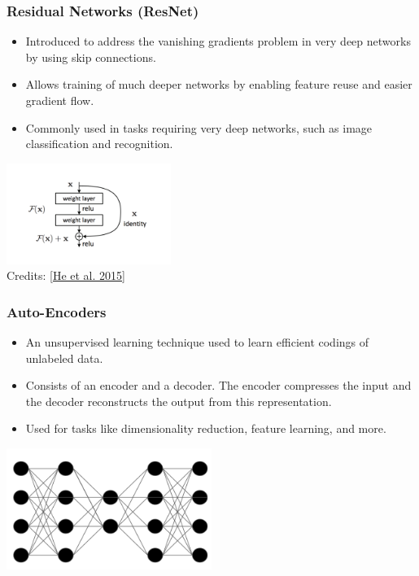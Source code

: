 \documentclass[aspectratio=169]{../latex_main/tntbeamer}  %
\begin{document}
        \begin{frame}
        \frametitle{Residual Networks (ResNet)}
        \begin{itemize}
            \item Introduced to address the vanishing gradients problem in very deep networks by using skip connections.
            \item Allows training of much deeper networks by enabling feature reuse and easier gradient flow.
            \item Commonly used in tasks requiring very deep networks, such as image classification and recognition.
        \end{itemize}
        \centering
        \includegraphics[width=0.4\textwidth]{figure/resnet.png}\\
        Credits: [\href{https://arxiv.org/pdf/1512.03385}{He et al. 2015}]
        \end{frame}

        \begin{frame}
        \frametitle{Auto-Encoders}
        \begin{itemize}
            \item An unsupervised learning technique used to learn efficient codings of unlabeled data.
            \item Consists of an encoder and a decoder. The encoder compresses the input and the decoder reconstructs the output from this representation.
            \item Used for tasks like dimensionality reduction, feature learning, and more.
        \end{itemize}
        \centering
        \includegraphics[width=0.5\textwidth]{figure/ae.png}
        \end{frame}
\end{document}
